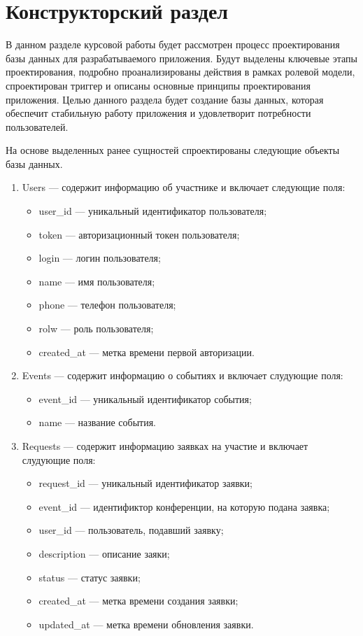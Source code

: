  \section{Конструкторский раздел} \label{desing}

В данном разделе курсовой работы будет рассмотрен процесс проектирования базы данных для разрабатываемого приложения. Будут выделены ключевые этапы проектирования, подробно проанализированы действия в рамках ролевой модели, спроектирован триггер и описаны основные принципы проектирования приложения. Целью данного раздела будет создание базы данных, которая обеспечит стабильную работу приложения и удовлетворит потребности пользователей.


На основе выделенных ранее сущностей спроектированы следующие объекты базы данных.
\begin{enumerate}	
	\item Users --- содержит информацию об участнике и включает следующие поля:
	\begin{itemize}[label=---]
		\item user{\_}id --- уникальный идентификатор пользователя;
		\item token --- авторизационный токен пользователя;
		\item login --- логин пользователя;
		\item name --- имя пользователя;
		\item phone --- телефон пользователя;
		\item rolw --- роль пользователя;
		\item created{\_}at ---  метка времени первой авторизации.
	\end{itemize}
	
	\item Events --- содержит информацию о событиях и включает слудующие поля:
	\begin{itemize}[label=---]
		\item event{\_}id --- уникальный идентификатор события;
		\item name --- название события.
	\end{itemize}
	
	\item Requests --- содержит информацию заявках на участие и включает слудующие поля:
	\begin{itemize}[label=---]
		\item request{\_}id --- уникальный идентификатор заявки;
		\item event{\_}id --- идентификтор конференции, на которую подана заявка;
		\item user{\_}id --- пользователь, подавший заявку;
		\item description --- описание заяки;
		\item status --- статус заявки;
		\item created{\_}at --- метка времени создания заявки;
		\item updated{\_}at --- метка времени обновления заявки.
	\end{itemize}
	

\end{enumerate}
